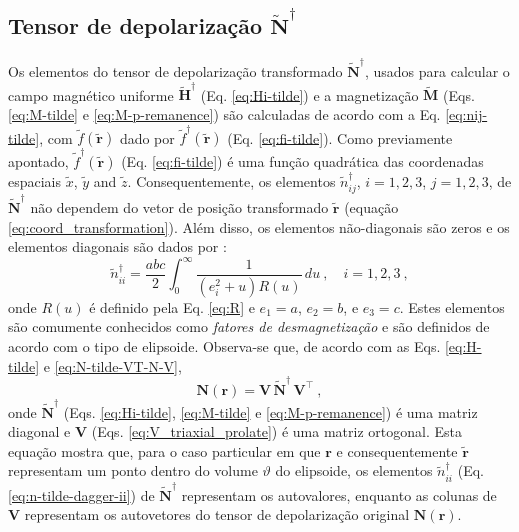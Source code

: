 \subsection{Tensor de depolarização $\tilde{\mathbf{N}}^{\dagger}$}

Os elementos do tensor de depolarização transformado $\tilde{\mathbf{N}}^{\dagger}$, usados para calcular o campo magnético uniforme $\tilde{\mathbf{H}}^{\dagger}$ (Eq. \ref{eq:Hi-tilde}) e a magnetização $\tilde{\mathbf{M}}$ (Eqs. \ref{eq:M-tilde} e \ref{eq:M-p-remanence}) são calculadas de acordo com a Eq. \ref{eq:nij-tilde}, com $\tilde{f}(\tilde{\mathbf{r}})$ dado por $\tilde{f}^{\dagger}(\tilde{\mathbf{r}})$ (Eq. \ref{eq:fi-tilde}). Como previamente apontado, $\tilde{f}^{\dagger}(\tilde{\mathbf{r}})$ (Eq. \ref{eq:fi-tilde}) é uma função quadrática das coordenadas espaciais $\tilde{x}$, $\tilde{y}$ and $\tilde{z}$. Consequentemente, os elementos $\tilde{n}^{\dagger}_{ij}$, $i = 1, 2, 3$, 
$j = 1, 2, 3$, de $\tilde{\mathbf{N}}^{\dagger}$ não dependem do vetor de posição transformado $\tilde{\mathbf{r}}$ (equação \ref{eq:coord_transformation}). Além disso, os elementos não-diagonais são zeros e os elementos diagonais são dados por \citep{stoner1945}: 
\begin{equation}
\tilde{n}^{\dagger}_{ii} = \frac{abc}{2}
\int_{0}^{\infty} \frac{1}{\left( e_{i}^{2} 
	+ u \right) R(u)} \, du \: , \quad i = 1, 2, 3 \: ,
\label{eq:n-tilde-dagger-ii}
\end{equation}
onde $R(u)$ é definido pela Eq. \ref{eq:R} e
$e_{1} = a$, $e_{2} = b$, e $e_{3} = c$. Estes elementos são comumente conhecidos como \textit{fatores de desmagnetização} e são definidos de acordo com o tipo de elipsoide. Observa-se que, de acordo com as Eqs. \ref{eq:H-tilde} e \ref{eq:N-tilde-VT-N-V},
\begin{equation}
\mathbf{N}(\mathbf{r}) = 
\mathbf{V} \, \tilde{\mathbf{N}}^{\dagger} \, 
\mathbf{V}^{\top} \: ,
\label{eq:N-V-N-dagger-VT}
\end{equation}
onde $\tilde{\mathbf{N}}^{\dagger}$ (Eqs. \ref{eq:Hi-tilde}, 
\ref{eq:M-tilde} e \ref{eq:M-p-remanence}) é uma matriz diagonal e $\mathbf{V}$ (Eqs. \ref{eq:V_triaxial_prolate}) é uma matriz ortogonal. Esta equação mostra que, para o caso particular em que $\mathbf{r}$ e consequentemente $\tilde{\mathbf{r}}$ representam um ponto dentro do volume $\vartheta$ do elipsoide, os elementos $\tilde{n}^{\dagger}_{ii}$ (Eq. \ref{eq:n-tilde-dagger-ii})
de $\tilde{\mathbf{N}}^{\dagger}$ representam os autovalores, enquanto as colunas de $\mathbf{V}$ representam os autovetores do tensor de depolarização original $\mathbf{N}(\mathbf{r})$.

